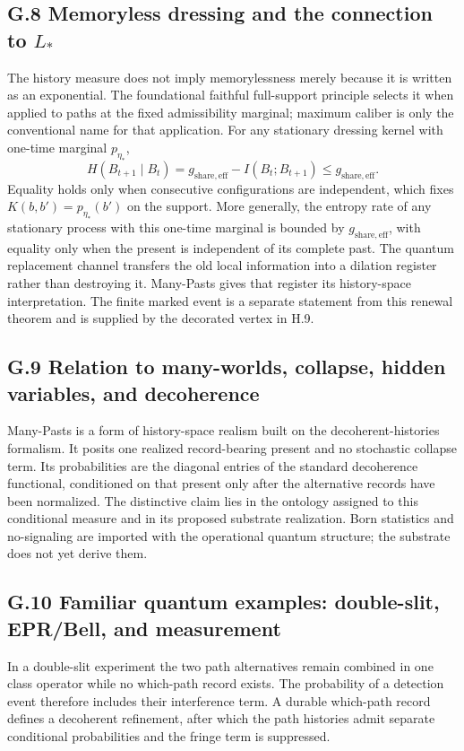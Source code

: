 \documentclass[11pt]{article}
\begin{document}
\subsection*{G.8 Memoryless dressing and the connection to $L_*$}

The history measure does not imply memorylessness merely because it is written as an exponential. The foundational faithful full-support principle selects it when applied to paths at the fixed admissibility marginal; maximum caliber is only the conventional name for that application. For any stationary dressing kernel with one-time marginal $p_{\eta_*}$,
\[
H(B_{t+1}\mid B_t)
=g_{\mathrm{share,eff}}-I(B_t;B_{t+1})
\le g_{\mathrm{share,eff}}.
\]
Equality holds only when consecutive configurations are independent, which fixes $K(b,b')=p_{\eta_*}(b')$ on the support. More generally, the entropy rate of any stationary process with this one-time marginal is bounded by $g_{\mathrm{share,eff}}$, with equality only when the present is independent of its complete past. The quantum replacement channel transfers the old local information into a dilation register rather than destroying it. Many-Pasts gives that register its history-space interpretation. The finite marked event is a separate statement from this renewal theorem and is supplied by the decorated vertex in H.9.

\subsection*{G.9 Relation to many-worlds, collapse, hidden variables, and decoherence}

Many-Pasts is a form of history-space realism built on the decoherent-histories formalism. It posits one realized record-bearing present and no stochastic collapse term. Its probabilities are the diagonal entries of the standard decoherence functional, conditioned on that present only after the alternative records have been normalized. The distinctive claim lies in the ontology assigned to this conditional measure and in its proposed substrate realization. Born statistics and no-signaling are imported with the operational quantum structure; the substrate does not yet derive them.


\subsection*{G.10 Familiar quantum examples: double-slit, EPR/Bell, and measurement}

In a double-slit experiment the two path alternatives remain combined in one class operator while no which-path record exists. The probability of a detection event therefore includes their interference term. A durable which-path record defines a decoherent refinement, after which the path histories admit separate conditional probabilities and the fringe term is suppressed.
\end{document}
